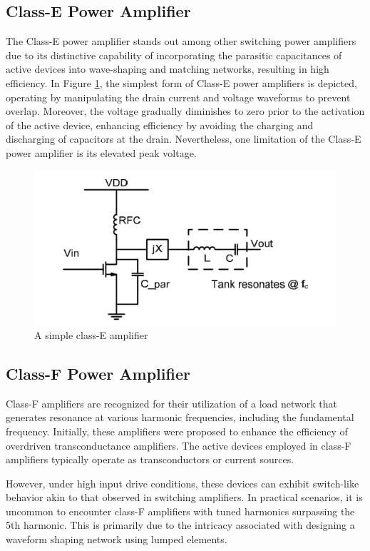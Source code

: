 \subsection{Class-E Power Amplifier}
The Class-E power amplifier stands out among other switching power amplifiers due to its distinctive capability of incorporating the parasitic capacitances of active devices into wave-shaping and matching networks, resulting in high efficiency. In Figure \ref{fig:class-E-amplifier}, the simplest form of Class-E power amplifiers is depicted, operating by manipulating the drain current and voltage waveforms to prevent overlap. Moreover, the voltage gradually diminishes to zero prior to the activation of the active device, enhancing efficiency by avoiding the charging and discharging of capacitors at the drain. Nevertheless, one limitation of the Class-E power amplifier is its elevated peak voltage.
\begin{figure}[h]
    \centering
    \includegraphics{figures/class-E.jpeg}
    \caption{A simple class-E amplifier \cite{twelveth}}
    \label{fig:class-E-amplifier}
\end{figure}

\subsection{Class-F Power Amplifier}
Class-F amplifiers are recognized for their utilization of a load network that generates resonance at various harmonic frequencies, including the fundamental frequency. Initially, these amplifiers were proposed to enhance the efficiency of overdriven transconductance amplifiers. The active devices employed in class-F amplifiers typically operate as transconductors or current sources.

However, under high input drive conditions, these devices can exhibit switch-like behavior akin to that observed in switching amplifiers. In practical scenarios, it is uncommon to encounter class-F amplifiers with tuned harmonics surpassing the 5th harmonic. This is primarily due to the intricacy associated with designing a waveform shaping network using lumped elements.

